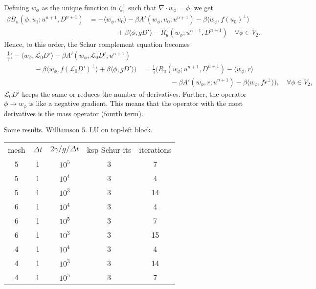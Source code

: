 \documentclass{article}
\begin{document}
Defining $w_\phi$ as the unique function in $\zeta_1^{\perp}$ such
that $\nabla\cdot w_\phi=\phi$, we get
\begin{align}
  \nonumber
  \beta B_u(\phi, u_1; u^{n+1},D^{n+1})
  & = 
  -\langle w_{\phi}, u_0 \rangle - \beta A'(w_\phi, u_0; u^{n+1})
  - \beta\langle w_\phi, f(u_0)^{\perp}\rangle \\
  & \qquad\qquad
  + \beta\langle \phi, gD'\rangle
  -R_u(w_\phi;u^{n+1},D^{n+1})
  \quad \forall \phi \in V_2.
\end{align}
Hence, to this order, the Schur complement equation becomes
\begin{align}
  \nonumber
  \frac{1}{\gamma}\Big(-\langle w_{\phi}, \mathcal{L}_0D' \rangle 
  - \beta A'(w_\phi, \mathcal{L}_0D'; u^{n+1}) \quad & \\
  \nonumber
\qquad  \qquad   - \beta\langle w_\phi, f(\mathcal{L}_0D')^{\perp}\rangle
  + \beta\langle \phi, gD'\rangle\Big)
  &= \frac{1}{\gamma}\Big(R_u(w_\phi;u^{n+1},D^{n+1})
  -\langle w_{\phi}, r \rangle  \\
  & \qquad\qquad -\beta A'(w_\phi, r; u^{n+1})
  - \beta\langle w_\phi, fr^{\perp}\rangle\Big),
  \quad \forall \phi \in V_2,
\end{align}
$\mathcal{L}_0D'$ keeps the same or reduces the number of derivatives.
Further, the operator $\phi\to w_\phi$ is like a negative gradient.
This means that the operator with the most derivatives is the
mass operator (fourth term).

Some results. Williamson 5. LU on top-left block.
\begin{tabular}{|c|c|c|c|c|}
  \hline
  mesh & $\Delta t$ & $2\gamma/g/\Delta t$ & ksp Schur its & iterations \\
  5 & 1 & $10^5$ & 3 & 7 \\
  5 & 1 & $10^4$ & 3 & 4 \\
  5 & 1 & $10^3$ & 3 & 14 \\
  6 & 1 & $10^4$ & 3 & 4 \\
  6 & 1 & $10^5$ & 3 & 7 \\
  6 & 1 & $10^3$ & 3 & 15 \\
  4 & 1 & $10^4$ & 3 & 4 \\
  4 & 1 & $10^3$ & 3 & 14 \\
  4 & 1 & $10^5$ & 3 & 7 \\
  \hline
\end{tabular}
\end{document}
